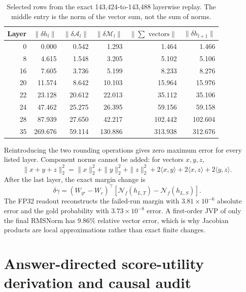 \begin{table}[h]
  \caption{Selected rows from the exact 143,424-to-143,488 layerwise replay.
  The middle entry is the norm of the vector sum, not the sum of norms.}
  \label{tab:layer-replay}
  \centering
  \small
  \begin{tabular}{r rrr rr}
    \toprule
    Layer & $\|\delta h_l\|$ & $\|\delta\mathcal A_l\|$ &
    $\|\delta\mathcal M_l\|$ & $\|\sum\text{ vectors}\|$ &
    $\|\delta h_{l+1}\|$\\
    \midrule
    0  & 0.000   & 0.542  & 1.293   & 1.464   & 1.466\\
    8  & 4.615   & 1.548  & 3.205   & 5.102   & 5.106\\
    16 & 7.605   & 3.736  & 5.199   & 8.233   & 8.276\\
    20 & 11.574  & 8.642  & 10.103  & 15.964  & 15.976\\
    22 & 23.128  & 20.612 & 22.013  & 35.112  & 35.106\\
    24 & 47.462  & 25.275 & 26.395  & 59.156  & 59.158\\
    28 & 87.939  & 27.650 & 42.217  & 102.442 & 102.604\\
    35 & 269.676 & 59.114 & 130.886 & 313.938 & 312.676\\
    \bottomrule
  \end{tabular}
\end{table}

Reintroducing the two rounding operations gives zero maximum error for every
listed layer.  Component norms cannot be added: for vectors $x,y,z$,
\begin{equation}
  \|x+y+z\|_2^2=\|x\|_2^2+\|y\|_2^2+\|z\|_2^2
  +2\langle x,y\rangle+2\langle x,z\rangle+2\langle y,z\rangle.
\end{equation}
After the last layer, the exact margin change is
\begin{equation}
  \delta\gamma=
  (W_{y^\star}-W_c)^\top
  [\mathcal N_f(h_{L,T})-\mathcal N_f(h_{L,S})].
\end{equation}
The FP32 readout reconstructs the failed-run margin with
$3.81\times10^{-6}$ absolute error and the gold probability with
$3.73\times10^{-8}$ error.  A first-order JVP of only the final RMSNorm has
9.86\% relative vector error, which is why Jacobian products are local
approximations rather than exact finite changes.

\section{Answer-directed score-utility derivation and causal audit}
\label{app:closure}

